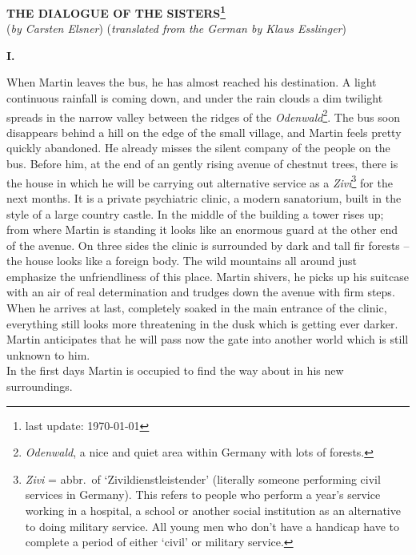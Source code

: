 

\begin {center} 
{\bf THE DIALOGUE OF THE SISTERS\footnote{last update: \today}} 
\[\] 
({\em by Carsten Elsner\/}) 
({\em translated from the German by Klaus Esslinger\/}) 
\end {center} 


\begin {center} 
{\bf I.} 
\end {center}
When Martin leaves the bus, he has almost reached his destination. 
A light continuous rainfall is coming down, and under the rain clouds a dim
twilight spreads in the narrow valley between the ridges of the 
{\em Odenwald\/}\footnote {{\em Odenwald}, a nice and quiet area 
within Germany with lots of forests.}. 
The bus soon disappears behind a hill on the edge of the small village, 
and Martin feels pretty quickly abandoned.
He already misses the silent company of the people on the bus. 
Before him, at the end of an gently rising avenue of chestnut trees, there
is the house in which he 
will be carrying out alternative service as a {\em Zivi\/}\footnote {{\em
    Zivi} = abbr.\ of `Zivildienstleistender' (literally someone performing civil services in Germany).
This refers to people who perform a year's service working in a hospital, a school 
or another social institution as an alternative to doing military service. All young men 
who don't have a handicap have to complete a period of either `civil' or military 
service.} for the next months.
It is a private psychiatric clinic, a modern sanatorium, built in the style of 
a large country castle. 
In the middle of the building a tower rises up; from where Martin is standing 
it looks like an enormous guard at the other end of the avenue. 
On three sides the clinic is surrounded by dark and tall fir forests -- the 
house looks like a foreign body. 
The wild mountains all around just emphasize the unfriendliness of this place. 
Martin shivers, he picks up his suitcase with an air of real determination and 
trudges down the avenue with firm steps. 
When he arrives at last, completely soaked in the main entrance of the clinic,
everything still looks more threatening in the dusk which is getting ever darker. 
Martin anticipates that he will pass now the gate into another world which is 
still unknown to him. \\ 
In the first days Martin is occupied to find the way about in his new surroundings. 
